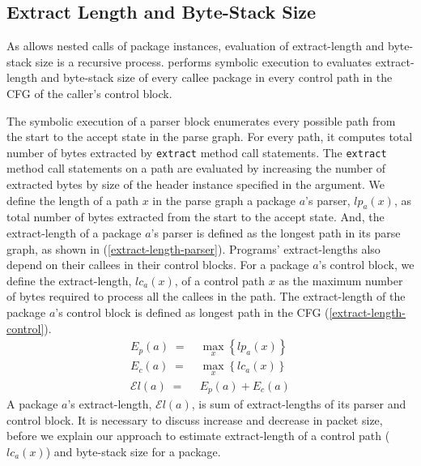 \documentclass[letterpaper,twocolumn,10pt]{article}
\begin{document}
\subsection{Extract Length and Byte-Stack Size}
\label{subsection:extract-length-and-byte-stack-size}
As \ulang allows nested calls of package instances, evaluation of extract-length and byte-stack size is a recursive process.
\ucomp performs symbolic execution to evaluates extract-length and byte-stack size of every callee package in every control path in the CFG of the caller's control block.


The symbolic execution of a parser block enumerates every possible path from the start to the accept state in the parse graph.
For every path, it computes total number of bytes extracted by \texttt{extract} method call statements.
The \texttt{extract} method call statements on a path are evaluated by increasing the number of extracted bytes by size of the header instance specified in the argument.
We define the length of a path $x$ in the parse graph a package $a$'s parser, $lp_{a}(x)$, as total number of bytes extracted from the start to the accept state.
And, the extract-length of a package $a$'s parser is defined as the longest path in its parse graph, as shown in (\ref{extract-length-parser}).
Programs' extract-lengths also depend on their callees in their control blocks.
For a package $a$'s control block, we define the extract-length, $lc_{a}(x)$, of a control path $x$ as the maximum number of bytes required to process all the callees in the path.
The extract-length of the package $a$'s control block is defined as longest path in the CFG (\ref{extract-length-control}).
\begin{align}
E_{p}(a)\; =& \; \max_{x}\left\{lp_{a}(x)\right\} \label{extract-length-parser} \\
E_{c}(a)\; =& \; \max_{x}\left\{lc_{a}(x)\right\} \label{extract-length-control} \\
\mathcal{E}l(a)\; =& \; E_{p}(a) + E_{c}(a) \label{extract-length-program}
\end{align}
A package $a$'s extract-length, $\mathcal{E}l(a)$, is sum of extract-lengths of its parser and control block.
It is necessary to discuss increase and decrease in packet size, before we explain our approach to estimate extract-length of a control path ($lc_{a}(x)$) and byte-stack size for a package.
\end{document}
